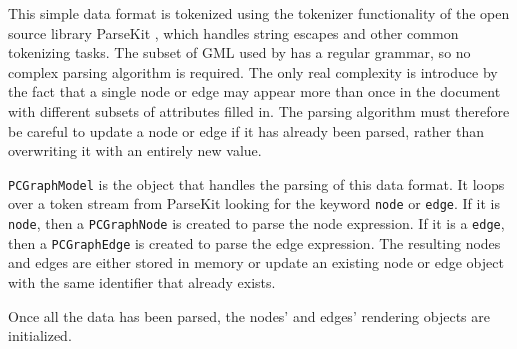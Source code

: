 This simple data format is tokenized using the tokenizer functionality of the
open source library ParseKit \cite{parsekit}, which handles string escapes and
other common tokenizing tasks. The subset of GML used by \pathcasemaw has a
regular grammar, so no complex parsing algorithm is required.  The only real
complexity is introduce by the fact that a single node or edge may appear more
than once in the document with different subsets of attributes filled in. The
parsing algorithm must therefore be careful to update a node or edge if it has
already been parsed, rather than overwriting it with an entirely new value.

\texttt{PCGraphModel} is the object that handles the parsing of this data
format. It loops over a token stream from ParseKit looking for the keyword
\texttt{node} or \texttt{edge}. If it is \texttt{node}, then a
\texttt{PCGraphNode} is created to parse the node expression. If it is a
\texttt{edge}, then a \texttt{PCGraphEdge} is created to parse the edge
expression. The resulting nodes and edges are either stored in memory or update
an existing node or edge object with the same identifier that already exists.

Once all the data has been parsed, the nodes' and edges' rendering objects are
initialized.


